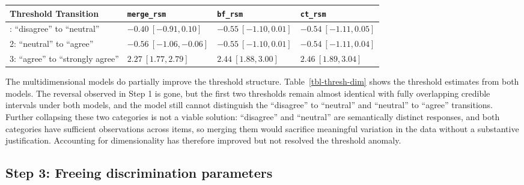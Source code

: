 \documentclass[
  man,
  floatsintext,
  longtable,
  nolmodern,
  notxfonts,
  notimes,
  colorlinks=true,linkcolor=blue,citecolor=blue,urlcolor=blue]{apa7}
\begin{document}
\begin{table}

{\caption{{Threshold estimates (with 95\% CrIs) from the unidimensional
and multidimensional RSMs.}{\label{tbl-thresh-dim}}}
\vspace{-20pt}}

\begin{longtable}[]{@{}llll@{}}
\toprule\noalign{}
Threshold Transition & \texttt{merge\_rsm} & \texttt{bf\_rsm} &
\texttt{ct\_rsm} \\
\midrule\noalign{}
\endhead
\bottomrule\noalign{}
\endlastfoot
1: ``disagree'' to ``neutral'' & \(-0.40 \ [-0.91, 0.10]\) &
\(-0.55 \ [-1.10, 0.01]\) & \(-0.54 \ [-1.11, 0.05]\) \\
2: ``neutral'' to ``agree'' & \(-0.56 \ [-1.06, -0.06]\) &
\(-0.55 \ [-1.10, 0.01]\) & \(-0.54 \ [-1.11, 0.04]\) \\
3: ``agree'' to ``strongly agree'' & \(2.27 \ [1.77, 2.79]\) &
\(2.44 \ [1.88, 3.00]\) & \(2.46 \ [1.89, 3.04]\) \\
\end{longtable}

\end{table}

The multidimensional models do partially improve the threshold
structure. Table~\ref{tbl-thresh-dim} shows the threshold estimates from
both models. The reversal observed in Step 1 is gone, but the first two
thresholds remain almost identical with fully overlapping credible
intervals under both models, and the model still cannot distinguish the
``disagree'' to ``neutral'' and ``neutral'' to ``agree'' transitions.
Further collapsing these two categories is not a viable solution:
``disagree'' and ``neutral'' are semantically distinct responses, and
both categories have sufficient observations across items, so merging
them would sacrifice meaningful variation in the data without a
substantive justification. Accounting for dimensionality has therefore
improved but not resolved the threshold anomaly.

\subsection{Step 3: Freeing discrimination
parameters}\label{step-3-freeing-discrimination-parameters}
\end{document}
